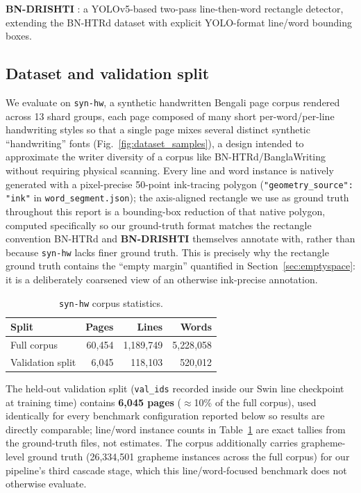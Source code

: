 \documentclass[11pt]{article}
\newcommand{\bnd}{\textbf{BN-DRISHTI}}
\begin{document}
\textbf{\bnd{}} \cite{jubaer2023bndrishti}: a YOLOv5-based two-pass line-then-word
rectangle detector, extending the BN-HTRd \cite{rahman2022bnhtrd} dataset with explicit
YOLO-format line/word bounding boxes.

\subsection{Dataset and validation split}

We evaluate on \texttt{syn-hw}, a synthetic handwritten Bengali page corpus rendered
across 13 shard groups, each page composed of many short per-word/per-line handwriting
styles so that a single page mixes several distinct synthetic ``handwriting'' fonts
(Fig.~\ref{fig:dataset_samples}), a design intended to approximate the writer diversity
of a corpus like BN-HTRd/BanglaWriting without requiring physical scanning. Every line
and word instance is natively generated with a pixel-precise 50-point ink-tracing
polygon (\texttt{"geometry\_source": "ink"} in \texttt{word\_segment.json}); the
axis-aligned rectangle we use as ground truth throughout this report is a bounding-box
reduction of that native polygon, computed specifically so our ground-truth format
matches the rectangle convention BN-HTRd and \bnd{} themselves annotate with, rather
than because \texttt{syn-hw} lacks finer ground truth. This is precisely why the
rectangle ground truth contains the ``empty margin'' quantified in
Section~\ref{sec:emptyspace}: it is a deliberately coarsened view of an
otherwise ink-precise annotation.

\begin{table}[H]
\centering
\caption{\texttt{syn-hw} corpus statistics.}
\label{tab:dataset}
\footnotesize
\begin{tabular}{@{}lrrr@{}}
\toprule
Split & Pages & Lines & Words \\
\midrule
Full corpus      & 60{,}454 & 1{,}189{,}749 & 5{,}228{,}058 \\
Validation split & 6{,}045  & 118{,}103     & 520{,}012 \\
\bottomrule
\end{tabular}
\end{table}

The held-out validation split (\texttt{val\_ids} recorded inside our Swin line
checkpoint at training time) contains \textbf{6{,}045 pages} ($\approx$10\% of the
full corpus), used identically for every benchmark configuration reported below so
results are directly comparable; line/word instance counts in Table~\ref{tab:dataset}
are exact tallies from the ground-truth files, not estimates. The corpus additionally
carries grapheme-level ground truth (26{,}334{,}501 grapheme instances across the full
corpus) for our pipeline's third cascade stage, which this line/word-focused benchmark
does not otherwise evaluate.
\end{document}
